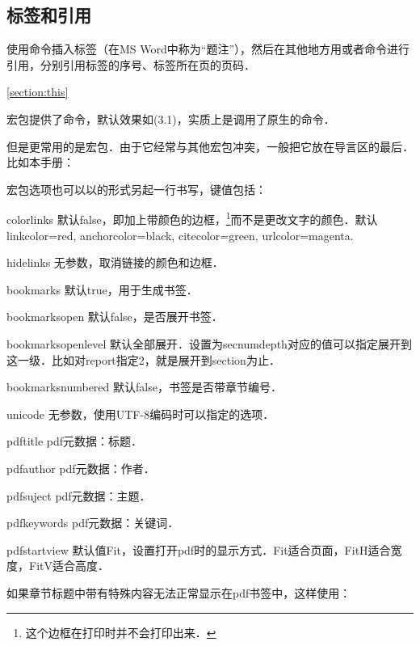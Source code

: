 \subsection{标签和引用}
使用命令插入标签（在MS Word中称为“题注”），然后在其他地方用或者命令进行引用，分别引用标签的序号、标签所在页的页码．
\begin{latex}
\label{section:this}
\ref{section:this}
\pageref{section:this}
\end{latex}

宏包提供了命令，默认效果如(3.1)，实质上是调用了原生的命令．

但是更常用的是宏包．由于它经常与其他宏包冲突，一般把它放在导言区的最后．比如本手册：
\begin{latex}
\usepackage[colorlinks,bookmarksopen=true,
    bookmarksnumbered=true]{hyperref}
\end{latex}

宏包选项也可以以的形式另起一行书写，键值包括：
\begin{para}
\item[colorlinks] 默认false，即加上带颜色的边框，\footnote{这个边框在打印时并不会打印出来．}而不是更改文字的颜色．默认linkcolor=red, anchorcolor=black, citecolor=green, urlcolor=magenta. 
\item[hidelinks] 无参数，取消链接的颜色和边框．
\item[bookmarks] 默认true，用于生成书签．
\item[bookmarksopen] 默认false，是否展开书签．
\item[bookmarksopenlevel] 默认全部展开．设置为secnumdepth对应的值可以指定展开到这一级．比如对report指定2，就是展开到section为止．
\item[bookmarksnumbered] 默认false，书签是否带章节编号．
\item[unicode] 无参数，使用UTF-8编码时可以指定的选项．
\item[pdftitle] pdf元数据：标题．
\item[pdfauthor] pdf元数据：作者．
\item[pdfsuject] pdf元数据：主题．
\item[pdfkeywords] pdf元数据：关键词．
\item[pdfstartview] 默认值Fit，设置打开pdf时的显示方式．Fit适合页面，FitH适合宽度，FitV适合高度．
\end{para}

如果章节标题中带有特殊内容无法正常显示在pdf书签中，这样使用：

